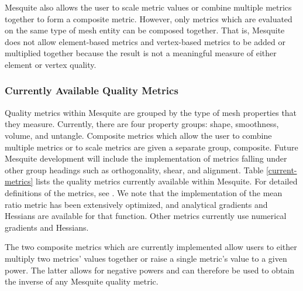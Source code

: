 Mesquite also allows the user to scale metric values or combine
multiple metrics together to form a composite metric.  However, only
metrics which are evaluated on the same type of mesh entity can be
composed together.  That is, Mesquite does not allow element-based
metrics and vertex-based metrics to be added or multiplied together
because the result is not a meaningful measure of either element or
vertex quality.

\subsubsection{Currently Available Quality Metrics}  
Quality metrics within
Mesquite are grouped by the type of mesh properties that they measure.
Currently, there are four property groups: shape, smoothness, volume,
and untangle.  Composite metrics which allow the user to combine
multiple metrics or to scale metrics are given a separate group,
composite.  Future Mesquite development will include the
implementation of metrics falling under other group headings such as
orthogonality, shear, and alignment.  Table \ref{current-metrics}
lists the quality metrics currently available within Mesquite.  For
detailed definitions of the metrics, see \cite{Kn01}.  We note that
the implementation of the mean ratio metric has been extensively
optimized, and analytical gradients and Hessians are available for
that function.  Other metrics currently use numerical gradients and
Hessians.

The two composite metrics which are currently implemented
allow users to either multiply two metrics' values
together or raise a single metric's value to a given power.
The latter allows for negative powers and can therefore be used
to obtain the inverse of any Mesquite quality metric.  

